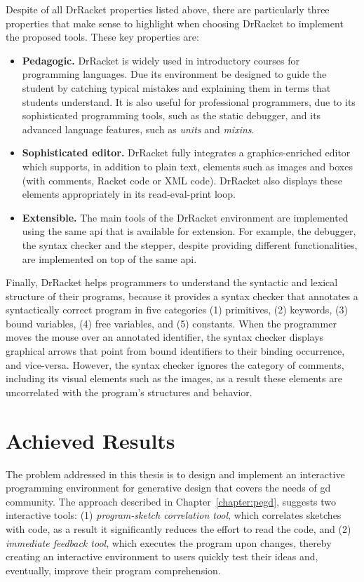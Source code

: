 Despite of all DrRacket properties listed above, there are particularly three properties that make sense to highlight when choosing DrRacket to implement the proposed tools. These key properties are:

\begin{itemize}
    \item \textbf{Pedagogic.} DrRacket is widely used in introductory courses for programming languages. Due its environment be designed to guide the student by catching typical mistakes and explaining them in terms that students understand. It is also useful for professional programmers, due to its sophisticated programming tools, such as the static debugger, and its advanced language features, such as \textit{units} and \textit{mixins}.

    \item \textbf{Sophisticated editor.} DrRacket fully integrates a graphics-enriched editor which supports, in addition to plain text, elements such as images and boxes (with comments, Racket code or XML code). DrRacket also displays these elements appropriately in its read-eval-print loop.

    \item \textbf{Extensible.} The main tools of the DrRacket environment are implemented using the same \gls{api} that is available for extension. For example, the debugger, the syntax checker and the stepper, despite providing different functionalities, are implemented on top of the same \gls{api}.
\end{itemize}

Finally, DrRacket helps programmers to understand the syntactic and lexical structure of their programs, because it provides a syntax checker that annotates a syntactically correct program in five categories (1) primitives, (2) keywords, (3) bound variables, (4) free variables, and (5) constants. When the programmer moves the mouse over an annotated identifier, the syntax checker displays graphical arrows that point from bound identifiers to their binding occurrence, and vice-versa. However, the syntax checker ignores the category of comments, including its visual elements such as the images, as a result these elements are uncorrelated with the program's structures and behavior.

\section{Achieved Results}

The problem addressed in this thesis is to design and implement an interactive programming environment for generative design that covers the needs of \gls{gd} community. The approach described in Chapter~\ref{chapter:pegd}, suggests two interactive tools: (1) \textit{program-sketch correlation tool}, which correlates sketches with code, as a result it significantly reduces the effort to read the code, and (2) \textit{immediate feedback tool}, which executes the program upon changes, thereby creating an interactive environment to users quickly test their ideas and, eventually, improve their program comprehension.



